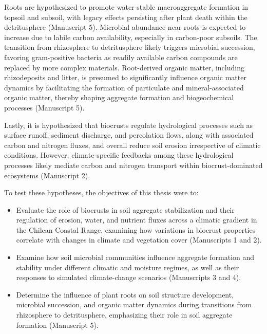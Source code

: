 Roots are hypothesized to promote water-stable macroaggregate formation in topsoil and subsoil, with legacy effects persisting after plant death within the detritusphere (Manuscript 5). Microbial abundance near roots is expected to increase due to labile carbon availability, especially in carbon-poor subsoils. The transition from rhizosphere to detritusphere likely triggers microbial succession, favoring gram-positive bacteria as readily available carbon compounds are replaced by more complex materials. Root-derived organic matter, including rhizodeposits and litter, is presumed to significantly influence organic matter dynamics by facilitating the formation of particulate and mineral-associated organic matter, thereby shaping aggregate formation and biogeochemical processes (Manuscript 5).

Lastly, it is hypothesized that biocrusts regulate hydrological processes such as surface runoff, sediment discharge, and percolation flows, along with associated carbon and nitrogen fluxes, and overall reduce soil erosion irrespective of climatic conditions. However, climate-specific feedbacks among these hydrological processes likely mediate carbon and nitrogen transport within biocrust-dominated ecosystems (Manuscript 2).

To test these hypotheses, the objectives of this thesis were to:
\begin{itemize}
  \item Evaluate the role of biocrusts in soil aggregate stabilization and their regulation of erosion, water, and nutrient fluxes across a climatic gradient in the Chilean Coastal Range, examining how variations in biocrust properties correlate with changes in climate and vegetation cover (Manuscripts 1 and 2).
  \item Examine how soil microbial communities influence aggregate formation and stability under different climatic and moisture regimes, as well as their responses to simulated climate-change scenarios (Manuscripts 3 and 4).
  \item Determine the influence of plant roots on soil structure development, microbial succession, and organic matter dynamics during transitions from rhizosphere to detritusphere, emphasizing their role in soil aggregate formation (Manuscript 5).
\end{itemize}